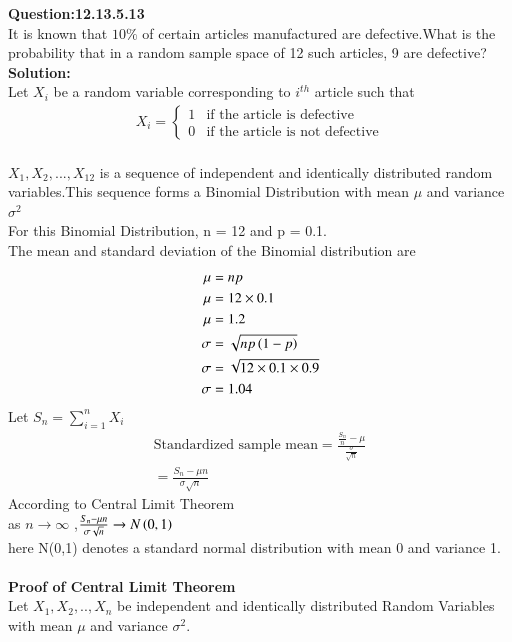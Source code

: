 \documentclass[journal,12pt,twocolumn]{IEEEtran}
\begin{document}
\textbf{Question:12.13.5.13}\\
 	It is known that $ 10\% $ of certain articles manufactured are defective.What is the probability that in a random sample space of 12 such articles, 9 are defective?
\\
 \textbf{Solution:}
 \\
Let $X_i$ be a random variable corresponding to $i^{th}$ article such that
\begin{align}
        X_i=  
        \begin{cases}
            1 &  \text{if the article is defective} \\
            0 &  \text{if the article is not defective}
        \end{cases}
    \end{align}
\\$X_1,X_2,...,X_{12}$ is a sequence of independent and identically distributed random variables.This sequence forms a Binomial Distribution with mean $\mu$ and variance $\sigma^2$
 \\For this Binomial Distribution, n = 12 and p = 0.1.
 \\The mean and standard deviation of the Binomial distribution are
 \begin{align}
    \mu &= np\\
    \mu &= 12\times0.1\nonumber\\
    \mu &= 1.2\\
    \sigma&= \sqrt{np\left(1-p\right)}\\
    \sigma&= \sqrt{12\times0.1\times0.9}\nonumber\\
    \sigma&= 1.04
    \end{align}
Let $S_n = \sum_{i=1}^{n} X_i$
\begin{align}
      \text{Standardized sample mean} = \frac{\frac{S_n}{n}-\mu}{\frac{\sigma}{\sqrt{n}}}\nonumber \\
      = \frac{S_n-\mu{n}}{\sigma{\sqrt{n}}} 
    \end{align}
According to Central Limit Theorem
\\as $n \to \infty$ ,$\frac{S_n -\mu{n}}{\sigma{\sqrt{n}}} \to N\left(0,1\right)$
\\here N(0,1) denotes a standard normal distribution with mean 0 and variance 1.
\\\\\textbf{Proof of Central Limit Theorem}
\\Let $X_1,X_2,..,X_n$ be independent and identically distributed Random Variables with mean $\mu$ and variance $\sigma^2$.
\end{document}
